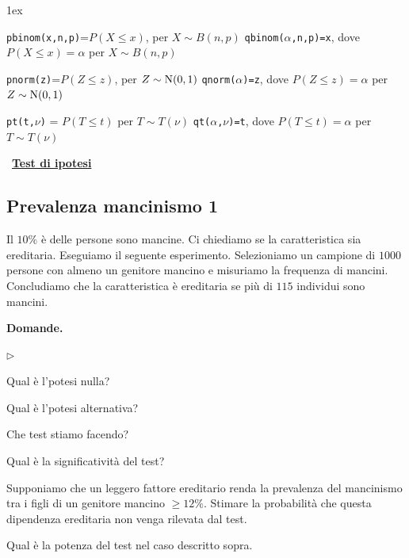 \documentclass[11pt,openany]{book}
\newcommand{\mylabel}[1]{{\footnotesize\textsf{#1}}\hfill}
\renewenvironment{itemize}
  {\begin{list}{$\triangleright$}{%
   \setlength{\parskip}{0mm}
   \setlength{\topsep}{.2\baselineskip}
   \setlength{\rightmargin}{0mm}
   \setlength{\listparindent}{0mm}
   \setlength{\itemindent}{0mm}
   \setlength{\labelwidth}{3ex}
   \setlength{\itemsep}{.4\baselineskip}
   \setlength{\parsep}{0mm}
   \setlength{\partopsep}{0mm}
   \setlength{\labelsep}{1ex}
   \setlength{\leftmargin}{\labelwidth+\labelsep}
   \let\makelabel\mylabel}}{%
   \end{list}\vspace*{-1.3mm}}
\begin{document}
\vfill
\parskip1ex
{\hrulefill\scriptsize

{\tt pbinom(x,n,p)}=$P(X\le x)$, per $X\sim B(n,p)$
\hfill 
{\tt qbinom($\alpha$,n,p)=x},  dove $P(X\le x)=\alpha$ per $X\sim B(n,p)$

{\tt pnorm(z)}=$P(Z\le z)$, per $Z\sim {\rm N}(0,1)$
\hfill 
{\tt qnorm($\alpha$)=z},  dove $P(Z\le z)=\alpha$ per $Z\sim {\rm N}(0,1)$

{\tt pt(t,$\nu$)} = $P(T\le t)$ per $T\sim T(\nu)$
\hfill
{\tt qt($\alpha$,$\nu$)=t}, dove $P(T\le t)=\alpha$ per $T\sim T(\nu)$

}

\clearpage\
\hfill\textbf{{\color{brown}\hyperref[test_ipotesi]{Test di ipotesi \faShare}}}
\subsection{Prevalenza mancinismo 1}
\label{Prevalenza mancinismo 1}

Il $10\%$ è delle persone sono mancine. Ci chiediamo se la caratteristica sia ereditaria. Eseguiamo il seguente esperimento. Selezioniamo un campione di $1000$ persone con almeno un genitore mancino e misuriamo la frequenza di mancini. Concludiamo che la caratteristica \`e ereditaria se pi\`u di $115$ individui sono mancini.

\textbf{Domande.}

\begin{itemize}
\item[1.] Qual è l'potesi nulla?

\item[2.] Qual è l'potesi alternativa?

\item[3.] Che test stiamo facendo?

\item[4.] Qual è la significatività del test?

\item[5.] Supponiamo che un leggero fattore ereditario renda la prevalenza del mancinismo tra i figli di un genitore mancino $\ge12\%$. Stimare la probabilità che questa dipendenza ereditaria non venga rilevata dal test. 

\item[6.] Qual è la potenza del test nel caso descritto sopra.
\end{itemize}
\end{document}
